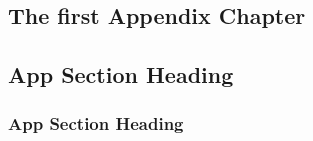 \documentclass[
DToption=dissertation,%
]{wsu-dissertation-thesis}
\begin{document}
\begin{appendices}\appendicestocpagenum

\chapter{The first Appendix Chapter}
\lipsum[1-5]

\section{App Section Heading}

\subsection{App Section Heading}



\end{appendices}
\clearpage

\renewcommand{\bibname}{\large\bfseries\MakeUppercase{Bibliography}}
\let\WriteBookmarks\relax
{}


\clearpage

\layout
\end{document}
